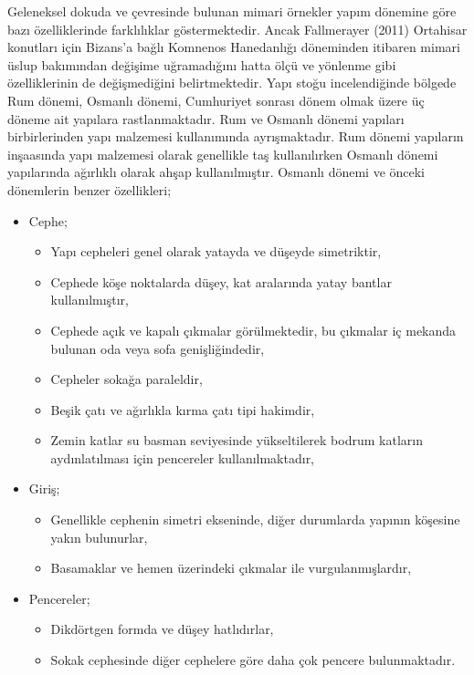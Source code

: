\documentclass[12pt,turkish,a4paperpaper,]{report}
\providecommand{\tightlist}{%
  \setlength{\itemsep}{0pt}\setlength{\parskip}{0pt}}
\begin{document}
Geleneksel dokuda ve çevresinde bulunan mimari örnekler yapım dönemine
göre bazı özelliklerinde farklılıklar göstermektedir. Ancak Fallmerayer
(2011) Ortahisar konutları için Bizans'a bağlı Komnenos Hanedanlığı
döneminden itibaren mimari üslup bakımından değişime uğramadığını hatta
ölçü ve yönlenme gibi özelliklerinin de değişmediğini belirtmektedir.
Yapı stoğu incelendiğinde bölgede Rum dönemi, Osmanlı dönemi, Cumhuriyet
sonrası dönem olmak üzere üç döneme ait yapılara rastlanmaktadır. Rum ve
Osmanlı dönemi yapıları birbirlerinden yapı malzemesi kullanımında
ayrışmaktadır. Rum dönemi yapıların inşaasında yapı malzemesi olarak
genellikle taş kullanılırken Osmanlı dönemi yapılarında ağırlıklı olarak
ahşap kullanılmıştır. Osmanlı dönemi ve önceki dönemlerin benzer
özellikleri;

\begin{itemize}
\tightlist
\item
  Cephe;

  \begin{itemize}
  \tightlist
  \item
    Yapı cepheleri genel olarak yatayda ve düşeyde simetriktir,
  \item
    Cephede köşe noktalarda düşey, kat aralarında yatay bantlar
    kullanılmıştır,
  \item
    Cephede açık ve kapalı çıkmalar görülmektedir, bu çıkmalar iç
    mekanda bulunan oda veya sofa genişliğindedir,
  \item
    Cepheler sokağa paraleldir,
  \item
    Beşik çatı ve ağırlıkla kırma çatı tipi hakimdir,
  \item
    Zemin katlar su basman seviyesinde yükseltilerek bodrum katların
    aydınlatılması için pencereler kullanılmaktadır,
  \end{itemize}
\item
  Giriş;

  \begin{itemize}
  \tightlist
  \item
    Genellikle cephenin simetri ekseninde, diğer durumlarda yapının
    köşesine yakın bulunurlar,
  \item
    Basamaklar ve hemen üzerindeki çıkmalar ile vurgulanmışlardır,
  \end{itemize}
\item
  Pencereler;

  \begin{itemize}
  \tightlist
  \item
    Dikdörtgen formda ve düşey hatlıdırlar,
  \item
    Sokak cephesinde diğer cephelere göre daha çok pencere
    bulunmaktadır.
  \end{itemize}
\end{itemize}
\end{document}
